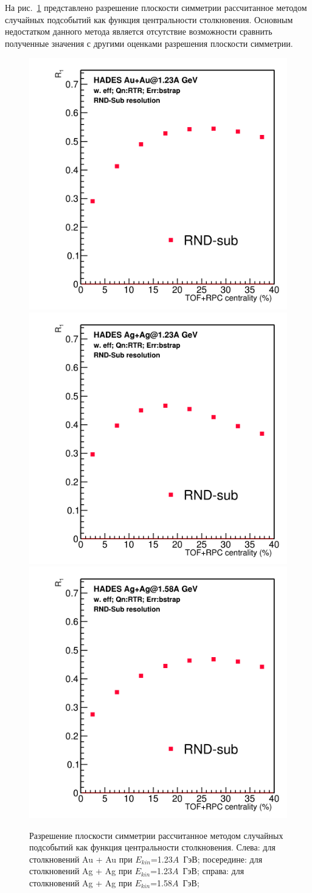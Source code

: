 На рис.~\ref{fig:hades_R1_rs} представлено разрешение плоскости симметрии рассчитанное методом случайных подсобытий как функция центральности столкновения.
Основным недостатком данного метода является отсутствие возможности сравнить полученные значения с другими оценками разрешения плоскости симметрии.
%
\begin{figure}[ht]
\begin{center}
    \includegraphics[width=0.3\linewidth]{images/R1_au123_rnd_centrality.png}
    \includegraphics[width=0.3\linewidth]{images/R1_ag123_rnd_centrality.png}
    \includegraphics[width=0.3\linewidth]{images/R1_ag158_rnd_centrality.png}
    \caption{Разрешение плоскости симметрии рассчитанное методом случайных подсобытий как функция центральности столкновения.
    Слева: для столкновений Au + Au при $E_{kin}$=1.23$A$~ГэВ;
    посередине: для столкновений Ag + Ag при $E_{kin}$=1.23$A$~ГэВ; 
    справа: для столкновений Ag + Ag при $E_{kin}$=1.58$A$~ГэВ; 
    }
    \label{fig:hades_R1_rs}
\end{center}
\end{figure}
%

